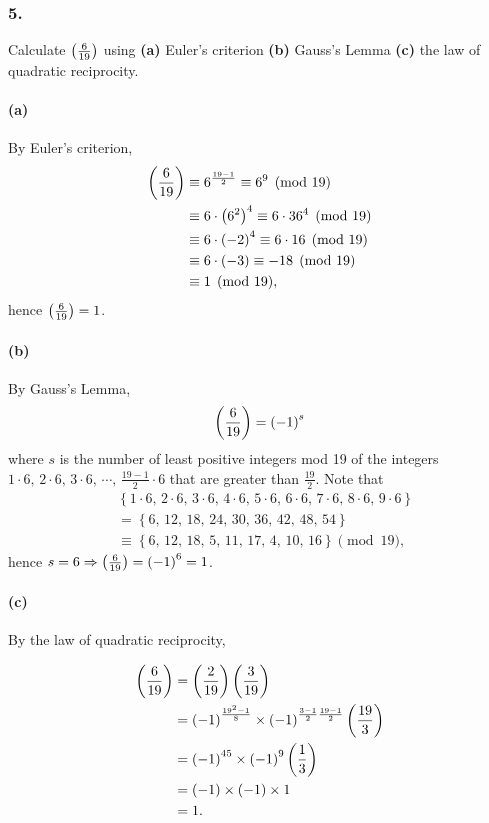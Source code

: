 \subsubsection{5.} Calculate $\left(\frac{6}{19}\right)$ using \textbf{(a)} Euler's
criterion \textbf{(b)} Gauss's Lemma \textbf{(c)} the law of quadratic
reciprocity.

\paragraph{(a)} By Euler's criterion,
\begin{align*}
    \left(\frac{6}{19}\right) & \equiv 6^{\frac{19-1}{2}} \equiv 6^9 \pmod{19} \\
    &\equiv 6 \cdot \left(6^2\right)^4 \equiv 6 \cdot 36^4 \pmod{19} \\
    &\equiv 6 \cdot \left(-2\right)^4 \equiv 6 \cdot 16 \pmod{19} \\
    &\equiv 6 \cdot \left(-3\right) \equiv -18 \pmod{19} \\
    &\equiv 1 \pmod{19},
\end{align*}
hence $\left(\frac{6}{19}\right)=1$.

\paragraph{(b)} By Gauss's Lemma,
\[
    \left(\frac{6}{19}\right) = \left(-1\right)^s
\]
where $s$ is the number of least positive integers mod 19 of the
integers $1\cdot 6,\,2\cdot 6,\,3\cdot 6,\,\cdots,\,\frac{19-1}{2}\cdot 6$
that are greater than $\frac{19}{2}$.
Note that
\begin{align*}
    & \left\{ 1\cdot 6,\,2\cdot 6,\,3\cdot 6,\,4\cdot 6,\,
    5\cdot 6,\,6\cdot 6,\,7\cdot 6,\,8\cdot 6,\,9\cdot 6\right\} \\
    &= \left\{ 6,\,12,\,18,\,24,\,30,\,36,\,42,\,48,\,54\right\} \\
    &\equiv \left\{ 6,\,12,\,18,\,5,\,11,\,17,\,4,\,10,\,16 \right\} \pmod{19},
\end{align*}
hence $s=6 \Rightarrow \left(\frac{6}{19}\right)=\left(-1\right)^6=1$.

\paragraph{(c)} By the law of quadratic reciprocity,

\begin{align*}
    \left(\frac{6}{19}\right) &= \left(\frac{2}{19}\right)\left(\frac{3}{19}\right) \\
    &= \left(-1\right)^{\frac{19^2-1}{8}} \times \left(-1\right)^{\frac{3-1}{2}\frac{19-1}{2}}\left(\frac{19}{3}\right) \\
    &= \left(-1\right)^{45} \times \left( -1 \right)^{9} \left(\frac{1}{3}\right) \\
    &= \left(-1\right) \times \left(-1\right) \times 1 \\
    &= 1.
\end{align*}

